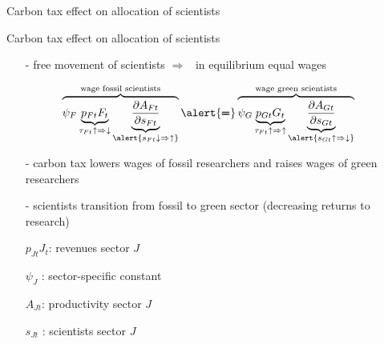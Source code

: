 \documentclass[11pt,aspectratio=169]{beamer}
\newcommand{\ar}{$\Rightarrow$ \ }
\begin{document}
\begin{frame}{Carbon tax effect on \alert{allocation of scientists}}
\end{frame}

\addtocounter{framenumber}{-1}

\begin{frame}{Carbon tax effect on \alert{allocation of scientists}}
	\begin{itemize}
		\item[-] free movement of scientists \ar in equilibrium equal wages
	\end{itemize}
	\vspace{0mm}
	\large
	\begin{align*}
		\overbrace{{\psi_F} \underbrace{p_{Ft}{F_t}}_{\tau_{Ft}\uparrow\Rightarrow\downarrow}\underbrace{\frac{\partial A_{Ft}}{\partial s_{Ft}}}_{\alert{{s_{Ft}\downarrow\Rightarrow\uparrow}}}}^{\text{wage fossil scientists}}\alert{\pmb{=}}\overbrace{{\psi_G} \underbrace{p_{Gt}{G_t}}_{\tau_{Ft}\uparrow\Rightarrow\uparrow}\underbrace{\frac{\partial A_{Gt}}{\partial s_{Gt}}}_{\alert{{s_{Gt}\uparrow\Rightarrow\downarrow}}}}^{\text{wage green scientists}}
	\end{align*}
	\normalsize
	\vspace{-2mm}
	\begin{itemize}
		\item[-] carbon tax lowers wages of fossil researchers and raises wages of green researchers
		\vspace{1mm}
		\item[-] scientists transition from fossil to green sector \small{(decreasing returns to research)}
	\end{itemize}
	\small
	\vspace{4mm}
	\hspace{-2mm}
	\begin{minipage}[t!]{0.4\textwidth}
		\vspace{0mm}
		\begin{itemize}
			\item[] $p_{Jt}J_t$: revenues sector $J$
			\vspace{-2mm}
			\item[] $\psi_J$ : sector-specific constant
		\end{itemize}
	\end{minipage}
	\vspace{-5mm}
	\begin{minipage}[t!]{0.5\textwidth}
		\vspace{0mm}
		\begin{itemize}	
			\item[] $A_{Jt}$: productivity sector $J$
			\vspace{-2mm}			
			\item[] $s_{Jt}$ : scientists sector $J$
		\end{itemize}
	\end{minipage}
	
\end{frame}
\end{document}
